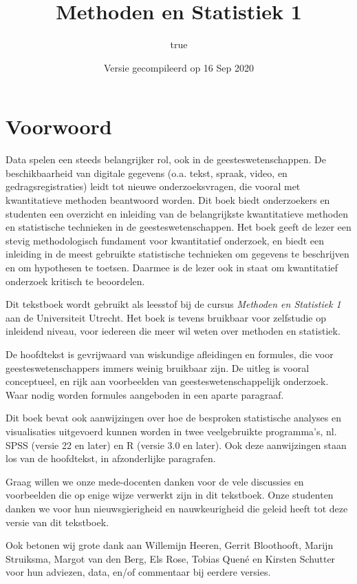 \documentclass[
]{book}
\title{Methoden en Statistiek 1}
\author{true}
\date{Versie gecompileerd op 16 Sep 2020}
\begin{document}
\maketitle

{
\setcounter{tocdepth}{1}
\tableofcontents
}
\hypertarget{voorwoord}{%
\chapter*{Voorwoord}\label{voorwoord}}

Data spelen een steeds belangrijker rol, ook in de geesteswetenschappen.
De beschikbaarheid van digitale gegevens (o.a. tekst, spraak, video, en gedragsregistraties) leidt tot nieuwe onderzoeksvragen, die vooral met kwantitatieve methoden beantwoord worden.
Dit boek biedt onderzoekers en studenten een overzicht en inleiding van de belangrijkste kwantitatieve methoden en statistische technieken in de geesteswetenschappen. Het boek geeft de lezer een stevig methodologisch fundament voor kwantitatief onderzoek, en biedt een inleiding in de meest gebruikte statistische technieken om gegevens te beschrijven en om hypothesen te toetsen. Daarmee is de lezer ook in staat om kwantitatief onderzoek kritisch te beoordelen.

Dit tekstboek wordt gebruikt als leesstof bij de cursus \emph{Methoden en Statistiek 1} aan de Universiteit Utrecht. Het boek is tevens bruikbaar voor zelfstudie op inleidend niveau, voor iedereen die meer wil weten over methoden en statistiek.

De hoofdtekst is gevrijwaard van wiskundige afleidingen en formules, die voor geesteswetenschappers immers weinig bruikbaar zijn. De uitleg is vooral conceptueel, en rijk aan voorbeelden van geesteswetenschappelijk onderzoek. Waar nodig worden formules aangeboden in een aparte paragraaf.

Dit boek bevat ook aanwijzingen over hoe de besproken statistische analyses en visualisaties uitgevoerd kunnen worden in twee veelgebruikte programma's, nl. SPSS (versie 22 en later) en R (versie 3.0 en later). Ook deze aanwijzingen staan los van de hoofdtekst, in afzonderlijke paragrafen.

Graag willen we onze mede-docenten danken voor de vele discussies en voorbeelden die op enige wijze verwerkt zijn in dit tekstboek. Onze studenten danken we voor hun nieuwsgierigheid en nauwkeurigheid die geleid heeft tot deze versie van dit tekstboek.

Ook betonen wij grote dank aan
Willemijn Heeren, Gerrit Bloothooft, Marijn Struiksma,
Margot van den Berg,
Els Rose,
Tobias Quené
en Kirsten Schutter
voor hun adviezen, data, en/of commentaar bij eerdere versies.
\end{document}
